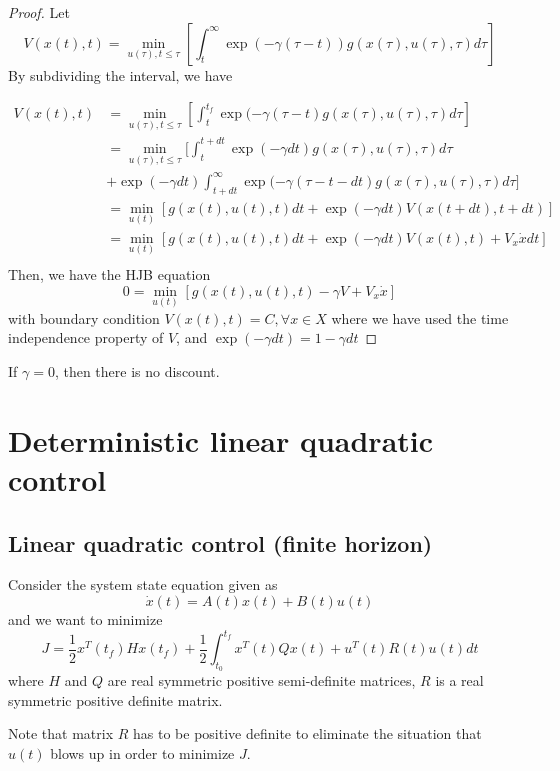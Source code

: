 \begin{refsection}
\begin{proof}
Let $$V(x(t),t)=\min_{u(\tau),t\leq \tau }[ \int_t^{\infty} \exp(-\gamma (\tau-t)) g(x(\tau),u(\tau),\tau) d\tau ]$$By subdividing the interval, we have

\begin{align*}
    V(x(t),t) &=\min_{u(\tau),t\leq \tau }[ \int_t^{t_f} \exp(-\gamma (\tau-t) g(x(\tau),u(\tau),\tau) d\tau ]\\
    &= \min_{u(\tau),t\leq \tau }[ \int_t^{t + dt}  \exp(-\gamma dt) g(x(\tau),u(\tau),\tau) d\tau \\  & + \exp(-\gamma dt) \int_{t+dt}^{\infty} \exp(-\gamma (\tau-t-dt) g(x(\tau),u(\tau),\tau) d\tau  ]\\
    &= \min_{u(t)}[ g(x(t),u(t),t) dt +  \exp(-\gamma dt) V(x(t+dt),t+dt)]\\
    & = \min_{u(t)}[ g(x(t),u(t),t) dt + \exp(-\gamma dt) V(x(t),t) + V_x \dot{x}dt]\\
\end{align*}
Then, we have the HJB equation 
$$0 = \min_{u(t)}[ g(x(t),u(t),t) -\gamma V+ V_x \dot{x}] $$
with boundary condition $V(x(t),t) = C, \forall x\in X$
where we have used the time independence property of $V$, and $\exp(-\gamma dt) = 1-\gamma dt$
\end{proof}

\begin{remark}
If $\gamma = 0$, then there is no discount.
\end{remark}


\section{Deterministic linear quadratic control}
\subsection{Linear quadratic control (finite horizon)}

\begin{definition}
Consider the system state equation given as
$$\dot{x}(t) = A(t)x(t) + B(t)u(t)$$
and we want to minimize
$$J = \frac{1}{2}x^T(t_f)Hx(t_f) + \frac{1}{2}\int_{t_0}^{t_f} x^T(t)Qx(t) + u^T(t)R(t)u(t) dt$$
where $H$ and $Q$ are real symmetric positive semi-definite matrices, $R$ is a real symmetric positive definite matrix.
\end{definition}

\begin{remark}
Note that matrix $R$ has to be positive definite to eliminate the situation that $u(t)$ blows up in order to minimize $J$.
\end{remark}



\end{refsection}
